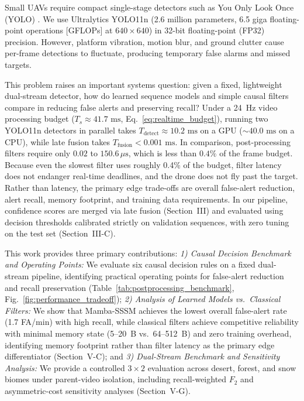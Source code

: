 \documentclass[conference]{IEEEtran}
\begin{document}
Small UAVs require compact single-stage detectors such as You Only Look Once (YOLO) \cite{redmon2016you}. We use Ultralytics YOLO11n \cite{jocher2024yolo11} (2.6 million parameters, 6.5 giga floating-point operations [GFLOPs] at $640 \times 640$) in 32-bit floating-point (FP32) precision. However, platform vibration, motion blur, and ground clutter cause per-frame detections to fluctuate, producing temporary false alarms and missed targets.

This problem raises an important systems question: given a fixed, lightweight dual-stream detector, how do learned sequence models and simple causal filters compare in reducing false alerts and preserving recall? Under a 24~Hz video processing budget ($T_s \approx 41.7\text{ ms}$, Eq.~\eqref{eq:realtime_budget}), running two YOLO11n detectors in parallel takes $T_{\text{detect}} \approx 10.2\text{ ms}$ on a GPU ($\sim 40.0\text{ ms}$ on a CPU), while late fusion takes $T_{\text{fusion}} < 0.001\text{ ms}$. In comparison, post-processing filters require only $0.02$ to $150.6\,\mu\text{s}$, which is less than $0.4\%$ of the frame budget. Because even the slowest filter uses roughly 0.4\% of the budget, filter latency does not endanger real-time deadlines, and the drone does not fly past the target. Rather than latency, the primary edge trade-offs are overall false-alert reduction, alert recall, memory footprint, and training data requirements. In our pipeline, confidence scores are merged via late fusion (Section~III) and evaluated using decision thresholds calibrated strictly on validation sequences, with zero tuning on the test set (Section~III-C).

This work provides three primary contributions:
\textit{1) Causal Decision Benchmark and Operating Points:} We evaluate six causal decision rules on a fixed dual-stream pipeline, identifying practical operating points for false-alert reduction and recall preservation (Table~\ref{tab:postprocessing_benchmark}, Fig.~\ref{fig:performance_tradeoff});
\textit{2) Analysis of Learned Models vs.\ Classical Filters:} We show that Mamba-SSSM achieves the lowest overall false-alert rate (1.7 FA/min) with high recall, while classical filters achieve competitive reliability with minimal memory state (5--20~B vs.\ 64--512~B) and zero training overhead, identifying memory footprint rather than filter latency as the primary edge differentiator (Section~V-C); and
\textit{3) Dual-Stream Benchmark and Sensitivity Analysis:} We provide a controlled $3\times 2$ evaluation across desert, forest, and snow biomes under parent-video isolation, including recall-weighted $F_2$ and asymmetric-cost sensitivity analyses (Section~V-G).
\end{document}
